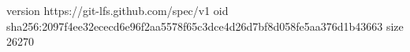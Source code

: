 version https://git-lfs.github.com/spec/v1
oid sha256:2097f4ee32ececd6e96f2aa5578f65c3dce4d26d7bf8d058fe5aa376d1b43663
size 26270
